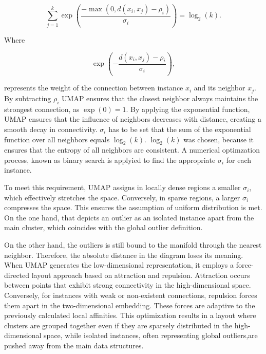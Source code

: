 \begin{equation}
    \sum_{j=1}^{k} \exp \left( \frac{-\max(0, d(x_i, x_j) - \rho_i)}{\sigma_i} \right) = \log_2(k).
     \label{eq:sigma}
\end{equation}

Where 

\begin{equation}
    \exp \left( {-\frac{d(x_i,x_j) - \rho_i}{\sigma_i}} \right),
\end{equation}

represents the weight of the connection between instance $x_i$ and its neighbor $x_j$.
By subtracting $\rho_i$ UMAP ensures that the closest neighbor always maintains the strongest connection, as $\exp(0) = 1$.
By applying the exponential function, UMAP ensures that the influence of neighbors decreases with distance, creating a smooth decay in connectivity.
$\sigma_i$ has to be set that the sum of the exponential function over all neighbors equals $\log_2(k)$.
$\log_2(k)$ was chosen, because it ensures that the entropy of all neighbors are consistent.
A numerical optimzation process, known as binary search is applyied to find the appropriate $\sigma_i$ for each instance.


To meet this requirement, UMAP assigns in locally dense regions a smaller $\sigma_i$, which effectively stretches the space.
Conversely, in sparse regions, a larger $\sigma_i$ compresses the space.
This ensures the assumption of uniform distribution is met.
On the one hand, that depicts an outlier as an isolated instance apart from the main cluster, which coincides with the global outlier definition.

\newpage
On the other hand, the outliers is still bound to the manifold through the nearest neighbor.
Therefore, the absolute distance in the diagram loses its meaning. 
When UMAP generates the low-dimensional representation, it employs a force-directed layout approach based on attraction and repulsion. 
Attraction occurs between points that exhibit strong connectivity in the high-dimensional space. 
Conversely, for instances with weak or non-existent connections, repulsion forces them apart in the two-dimensional embedding. 
These forces are adaptive to the previously calculated local affinities. 
This optimization results in a layout where clusters are grouped together even if they are sparsely distributed in the high-dimensional space, while isolated instances, often representing global outliers,are pushed away from the main data structures.


